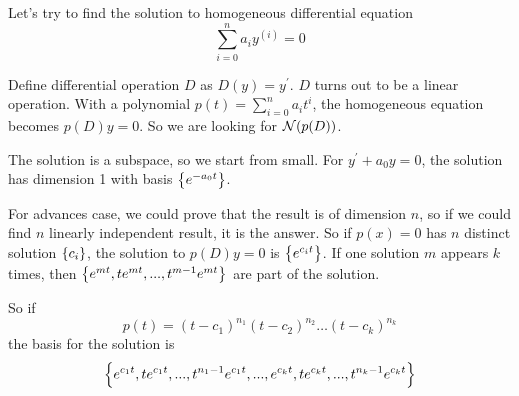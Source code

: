 \begin{example}
    Let's try to find the solution to homogeneous differential equation 
    \begin{equation*}
        \sum_{i=0}^n a_i y^{(i)} = 0
    \end{equation*}
    
    Define differential operation $D$ as $D(y) = y^\prime$. $D$ turns out to be a linear operation. With a polynomial $p(t) = \sum_{i=0}^n a_i t^i$, the homogeneous equation becomes $p(D)y = 0$. So we are looking for $\mathcal{N}(p(D))$.
    
    The solution is a subspace, so we start from small. For $y^\prime + a_0 y = 0$, the solution has dimension 1 with basis $\set{e^{-a_0 t}}$.
    
    For advances case, we could prove that the result is of dimension $n$, so if we could find $n$ linearly independent result, it is the answer. So if $p(x) = 0$ has $n$ distinct solution $\set{c_i}$, the solution to $p(D)y = 0$ is $\set{e^{c_i t}}$. If one solution $m$ appears $k$ times, then $\set{e^{mt}, t e^{mt}, ..., t^{m-1} e^{mt}}$ are part of the solution. 
    
    So if 
    \begin{equation*}
        p(t) = (t-c_1)^{n_1} (t-c_2)^{n_2} \hdots (t-c_k)^{n_k} 
    \end{equation*}
    the basis for the solution is 
    \begin{equation*}
        \set{e^{c_1 t}, t e^{c_1 t}, ... , t^{n_1 -1} e^{c_1 t}, ... ,  e^{c_k t}, t e^{c_k t}, ..., t^{n_k -1} e^{c_k t}}
    \end{equation*}
\end{example}


